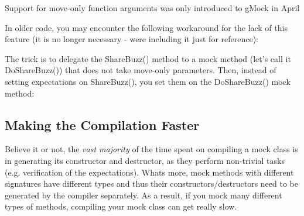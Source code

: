 Support for move-\/only function arguments was only introduced to g\+Mock in April
\begin{DoxyEnumerate}
\item In older code, you may encounter the following workaround for the lack of this feature (it is no longer necessary -\/ we\textquotesingle{}re including it just for reference)\+:
\end{DoxyEnumerate}


\begin{DoxyCode}{0}
\DoxyCodeLine{ \textcolor{keyword}{public}:}
\DoxyCodeLine{  \}}
\DoxyCodeLine{\};}
\end{DoxyCode}


The trick is to delegate the {\ttfamily Share\+Buzz()} method to a mock method (let’s call it {\ttfamily Do\+Share\+Buzz()}) that does not take move-\/only parameters. Then, instead of setting expectations on {\ttfamily Share\+Buzz()}, you set them on the {\ttfamily Do\+Share\+Buzz()} mock method\+:


\begin{DoxyCode}{0}
\DoxyCodeLine{}
\DoxyCodeLine{\textcolor{comment}{// When one calls ShareBuzz() on the MockBuzzer like this, the call is}}
\DoxyCodeLine{\textcolor{comment}{// forwarded to DoShareBuzz(), which is mocked.  Therefore this statement}}
\DoxyCodeLine{\textcolor{comment}{// will trigger the above EXPECT\_CALL.}}
\end{DoxyCode}


\subsection*{Making the Compilation Faster}

Believe it or not, the {\itshape vast majority} of the time spent on compiling a mock class is in generating its constructor and destructor, as they perform non-\/trivial tasks (e.\+g. verification of the expectations). What\textquotesingle{}s more, mock methods with different signatures have different types and thus their constructors/destructors need to be generated by the compiler separately. As a result, if you mock many different types of methods, compiling your mock class can get really slow.

